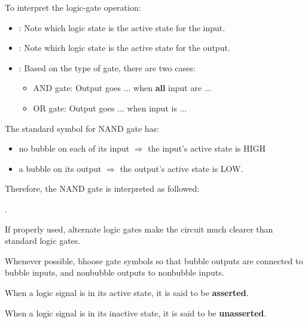       \par To interpret the logic-gate operation:
      \begin{itemize}
        \item {}: Note which logic state is the active state for the input.
        \item {}: Note which logic state is the active state for the output.
        \item {}: Based on the type of gate, there are two cases:
          \begin{itemize}
            \item AND gate: Output goes ... when \textbf{all} input are ...
            \item OR gate: Output goes ... when  input is ...
          \end{itemize}
      \end{itemize}

    \par The standard symbol for NAND gate has:
    \begin{itemize}
      \item no bubble on each of its input $\Rightarrow$ the input's active
      state is HIGH
      \item a bubble on its output $\Rightarrow$ the output's active state
      is LOW.
    \end{itemize}
    \par Therefore, the NAND gate is interpreted as followed:
    \par {}.
  \hiiEND


    \par If properly used, alternate logic gates make the circuit much clearer
    than standard logic gates.
    \par Whenever possible, bhoose gate symbols so that bubble outputs are
    connected to bubble inputs, and nonbubble outputs to nonbubble inputs.
    \par When a logic signal is in its active state, it is said to be
    \textbf{asserted}.
    \par When a logic signal is in its inactive state, it is said to be
    \textbf{unasserted}.